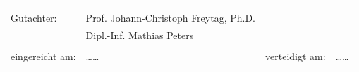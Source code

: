 \begin{titlepage}
{\begin{tabular}{llll}
    &&&\\
    Gutachter: & Prof. Johann-Christoph Freytag, Ph.D. && \\
		      & Dipl.-Inf. Mathias Peters && \\%
    &&&\\
    eingereicht am:     & \dots\dots & \hspace{1cm} 
    verteidigt am: & \dots\dots \\ %
  \end{tabular}
}

\end{titlepage}
